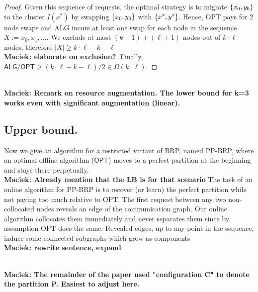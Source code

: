 \documentclass[manuscript,screen=true, review, anonymous]{acmart}
\newcommand{\OPT}{\textsf{OPT}\xspace}
\newcommand{\ALG}{\textsf{ALG}\xspace}
\newcommand{\OBRP}{BRP}
\newcommand{\PPOBRP}{PP-BRP}
\DeclarePairedDelimiter\set{\{}{\}}
\newcommand\maciek[1]{\color{brown}\textbf{\\ Maciek: #1}\color{black}}
\begin{document}
\begin{proof}
	Given this sequence of requests,
	the optimal strategy is to migrate $\set{x_0,y_0}$ to the cluster $I(x^*)$ by
	swapping $\set{x_0,y_0}$ with $\set{x^*,y^*}$.
	Hence,
	OPT pays for $2$ node swaps and
	\ALG{} incurs at least one swap for each node in the sequence $X := x_0, x_1,\dots$.
	We exclude at most $(k-1) + ( \ell+1)$ nodes out of $k \cdot \ell$ nodes,
  therefore $|X| \geq k \cdot \ell - k - \ell$ \maciek{elaborate on exclusion?}.
  Finally, $\ALG/\OPT \geq (k \cdot \ell - k - \ell) / 2\in \Omega(k\cdot\ell)$.
\end{proof}

\maciek{Remark on resource augmentation. The lower bound for k=3 works even with significant augmentation (linear).}

\subsection{Upper bound.}
\label{sec:ppl}
Now we give an algorithm for a restricted variant of  \OBRP{}, named \PPOBRP{},
where an optimal offline algorithm ($\OPT$) moves to a perfect partition
at the beginning and stays there perpetually.
\maciek{Already mention that the LB is for that scenario}
The task of an online algorithm for \PPOBRP{} is to recover (or learn) the perfect partition while not paying too much relative to \OPT.
%
The first request between any two non-collocated nodes reveals an edge of the communication graph.
Our online algorithm collocates them immediately and never separates them since by assumption \OPT does the same.
Revealed edges, up to any point in the sequence,
induce some connected subgraphs which grow as components \maciek{rewrite sentence, expand}.

\maciek{The remainder of the paper used "configuration C" to denote the partition P. Easiest to adjust here.}
\end{document}
